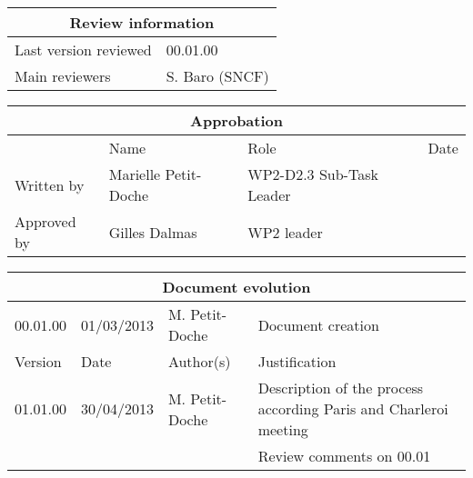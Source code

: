 \documentclass{template/openetcs_article}
\begin{document}
\begin{tabular}{|p{4.4cm}|p{8.7cm}|}
\hline
\multicolumn{2}{|c|}{Review information} \\
\hline
Last version reviewed & 00.01.00 \\
\hline
Main reviewers & S. Baro (SNCF) \\
\hline
\end{tabular}

\begin{tabular}{|p{2.2cm}|p{4cm}|p{4cm}|p{2cm}|}
\hline
\multicolumn{4}{|c|}{Approbation} \\
\hline
  &  Name & Role & Date   \\
\hline  
Written by    &  Marielle Petit-Doche & WP2-D2.3 Sub-Task Leader  & \\
\hline
Approved by & Gilles Dalmas & WP2 leader & \\
\hline
\end{tabular}

\begin{tabular}{|p{2.2cm}|p{2cm}|p{3cm}|p{5cm}|}
\hline
\multicolumn{4}{|c|}{Document evolution} \\
\hline
00.01.00 & 01/03/2013 & M. Petit-Doche &  Document creation  \\
Version &  Date & Author(s) & Justification  \\
\hline  
01.01.00 & 30/04/2013 & M. Petit-Doche &  Description of the process according Paris and Charleroi meeting  \\
& & & Review comments on 00.01 \\
\hline  
\end{tabular}



\newcommand{\tbd}{\colorbox{cyan}{\%\%To Be Defined\%\%}}
\newcommand{\tbc}{\colorbox{cyan}{\%\%To Be Confirmed\%\%}}
\newcommand{\todo}[1]{\colorbox{cyan}{\%\%{#1}\%\%}}
\newlength{\origindent}

\newenvironment{issue}{
        \begin{quote}
        \begin{itshape}Open Issue.
}{
        \end{itshape}
        \end{quote}
}

\newenvironment{comment}{
        \begin{quote}
        \begin{itshape}Comment.
}{
        \end{itshape}
        \end{quote}
}
\end{document}
